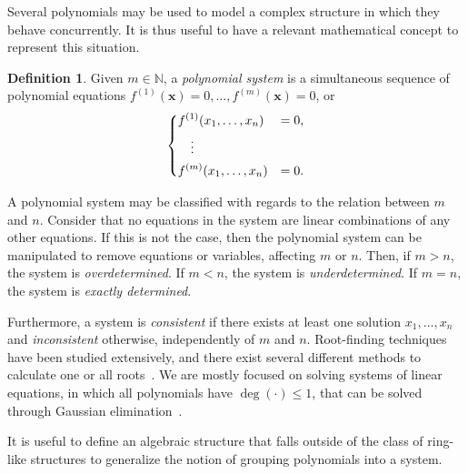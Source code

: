\documentclass[english]{ufsc-thesis-rn46-2019/ufsc-thesis-rn46-2019}
\theoremstyle{definition}
\newtheorem{definition}[theorem]{Definition}
\begin{document}
Several polynomials may be used to model a complex structure in which they
behave concurrently. It is thus useful to have a relevant mathematical concept
to represent this situation.

\begin{definition}\label{def:poly-sys}
  Given $m \in \mathbb{N}$, a \emph{polynomial system} is a simultaneous
  sequence of polynomial equations
  $f^{(1)}(\mathbf{x}) = 0, \dots, f^{(m)}(\mathbf{x}) = 0$, or
  \begin{align}
    \begin{dcases}
      f^{(1)}(x_{1}, \dots, x_{n}) &= 0, \\
      \quad \vdots                       \\
      f^{(m)}(x_{1}, \dots, x_{n}) &= 0.
    \end{dcases}
  \end{align}
\end{definition}

A polynomial system may be classified with regards to the relation between $m$
and $n$. Consider that no equations in the system are linear combinations of
any other equations. If this is not the case, then the polynomial system can be
manipulated to remove equations or variables, affecting $m$ or $n$. Then, if
$m > n$, the system is \emph{overdetermined}. If $m < n$, the system is
\emph{underdetermined}. If $m = n$, the system is \emph{exactly determined}.

Furthermore, a system is \emph{consistent} if there exists at least one
solution $x_{1}, \dots, x_{n}$ and \emph{inconsistent} otherwise, independently
of $m$ and $n$. Root-finding techniques have been studied extensively, and
there exist several different methods to calculate one or all
roots~\cite[Chap.~9]{Press:2007}. We are mostly focused on solving systems of
linear equations, in which all polynomials have $\deg(\cdot) \leq 1$, that can
be solved through Gaussian elimination~\cite[Sec.~2.2]{Press:2007}.

It is useful to define an algebraic structure that falls outside of the class
of ring-like structures to generalize the notion of grouping polynomials into
a system.
\end{document}
